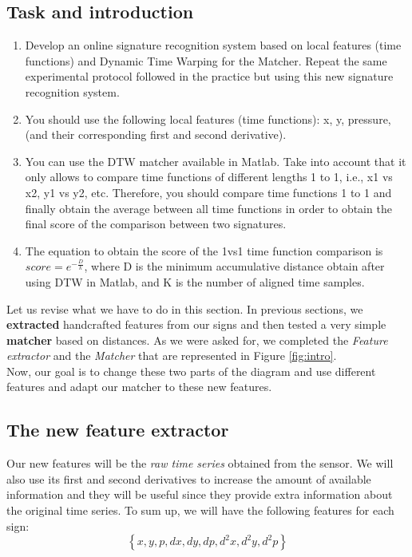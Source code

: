\documentclass[a4paper]{article}
\begin{document}
{\subsection*{Task and introduction}
\begin{enumerate}
  \item 	Develop an online signature recognition system based on local features (time functions) and Dynamic Time Warping for the Matcher. Repeat the same experimental protocol followed in the practice but using this new signature recognition system.
  \item 	You should use the following local features (time functions): x, y, pressure, (and their corresponding first and second derivative).
  \item 	You can use the DTW matcher available in Matlab. Take into account that it only allows to compare time functions of different lengths 1 to 1, i.e., x1 vs x2, y1 vs y2, etc. Therefore, you should compare time functions 1 to 1 and finally obtain the average between all time functions in order to obtain the final score of the comparison between two signatures.
  \item 	The equation to obtain the score of the 1vs1 time function comparison is \(score=e^{-\frac{D}{k}}\), where D is the minimum accumulative distance obtain after using DTW in Matlab, and K is the number of aligned time samples.
\end{enumerate}

Let us revise what we have to do in this section. In previous sections, we \textbf{extracted} handcrafted features from our signs and then tested a very simple \textbf{matcher} based on distances. As we were asked for, we completed the \emph{Feature extractor} and the \emph{Matcher} that are represented in Figure \ref{fig:intro}.\\

Now, our goal is to change these two parts of the diagram and use different features and adapt our matcher to these new features.

\subsection{The new feature extractor}

Our new features will be the \emph{raw time series} obtained from the sensor. We will also use its first and second derivatives to increase the amount of available information and they will be useful since they provide extra information about the original time series. To sum up, we will have the following features for each sign:
\[
\left\{x, y, p, dx, dy, dp, d^2x, d^2y, d^2p\right\}  
\]

}
\end{document}
